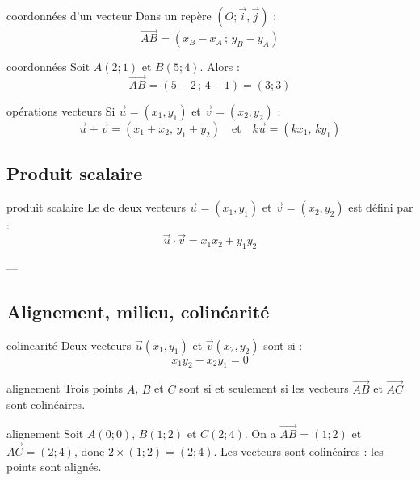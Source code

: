\begin{definition}{}{coordonnées d'un vecteur}
Dans un repère $(O; \vec{i}, \vec{j})$ :
\[
\overrightarrow{AB} = (x_B - x_A \, ; \, y_B - y_A)
\]
\end{definition}

\begin{exemple}{}{coordonnées}
Soit $A(2; 1)$ et $B(5; 4)$.  
Alors :
\[
\overrightarrow{AB} = (5 - 2 \, ; \, 4 - 1) = (3; 3)
\]
\end{exemple}

\begin{proposition}{}{opérations vecteurs}
Si $\overrightarrow{u} = (x_1, y_1)$ et $\overrightarrow{v} = (x_2, y_2)$ :
\[
\overrightarrow{u} + \overrightarrow{v} = (x_1 + x_2, \, y_1 + y_2)
\quad \text{et} \quad
k\overrightarrow{u} = (kx_1, \, ky_1)
\]
\end{proposition}

\subsection{Produit scalaire}



\begin{definition}{}{produit scalaire}
    Le  de deux vecteurs $\overrightarrow{u} = (x_1, y_1)$ et $\overrightarrow{v} = (x_2, y_2)$ est défini par :
    \[
    \overrightarrow{u} \cdot \overrightarrow{v} = x_1 x_2 + y_1 y_2
    \]
\end{definition}
---

\subsection{Alignement, milieu, colinéarité}

\begin{definition}{}{colinearité}
Deux vecteurs $\overrightarrow{u}(x_1, y_1)$ et $\overrightarrow{v}(x_2, y_2)$ sont  si :
\[
x_1 y_2 - x_2 y_1 = 0
\]
\end{definition}

\begin{proposition}{}{alignement}
Trois points $A$, $B$ et $C$ sont  si et seulement si les vecteurs $\overrightarrow{AB}$ et $\overrightarrow{AC}$ sont colinéaires.
\end{proposition}

\begin{exemple}{}{alignement}
Soit $A(0;0)$, $B(1;2)$ et $C(2;4)$.  
On a $\overrightarrow{AB} = (1;2)$ et $\overrightarrow{AC} = (2;4)$, donc $2\times(1;2) = (2;4)$.  
Les vecteurs sont colinéaires : les points sont alignés.
\end{exemple}

